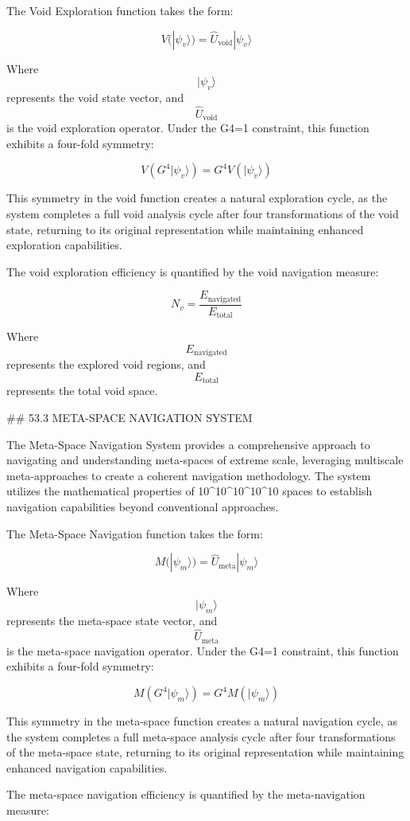 The Void Exploration function takes the form:

$$ V(|\psi_v\rangle) = \hat{U}_{\text{void}} |\psi_v\rangle $$

Where $$ |\psi_v\rangle $$ represents the void state vector, and $$ \hat{U}_{\text{void}} $$ is the void exploration operator. Under the G4=1 constraint, this function exhibits a four-fold symmetry:

$$ V(G^4 |\psi_v\rangle) = G^4 V(|\psi_v\rangle) $$

This symmetry in the void function creates a natural exploration cycle, as the system completes a full void analysis cycle after four transformations of the void state, returning to its original representation while maintaining enhanced exploration capabilities.

The void exploration efficiency is quantified by the void navigation measure:

$$ N_v = \frac{E_{\text{navigated}}}{E_{\text{total}}} $$

Where $$ E_{\text{navigated}} $$ represents the explored void regions, and $$ E_{\text{total}} $$ represents the total void space.

## 53.3 META-SPACE NAVIGATION SYSTEM

The Meta-Space Navigation System provides a comprehensive approach to navigating and understanding meta-spaces of extreme scale, leveraging multiscale meta-approaches to create a coherent navigation methodology. The system utilizes the mathematical properties of 10^10^10^10^10 spaces to establish navigation capabilities beyond conventional approaches.

The Meta-Space Navigation function takes the form:

$$ M(|\psi_m\rangle) = \hat{U}_{\text{meta}} |\psi_m\rangle $$

Where $$ |\psi_m\rangle $$ represents the meta-space state vector, and $$ \hat{U}_{\text{meta}} $$ is the meta-space navigation operator. Under the G4=1 constraint, this function exhibits a four-fold symmetry:

$$ M(G^4 |\psi_m\rangle) = G^4 M(|\psi_m\rangle) $$

This symmetry in the meta-space function creates a natural navigation cycle, as the system completes a full meta-space analysis cycle after four transformations of the meta-space state, returning to its original representation while maintaining enhanced navigation capabilities.

The meta-space navigation efficiency is quantified by the meta-navigation measure:

